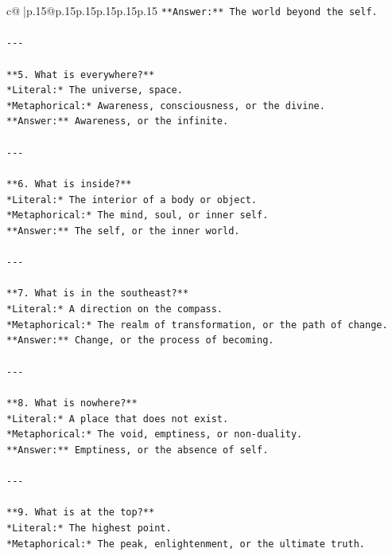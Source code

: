 \documentclass{article}
\begin{document}
{\begin{supertabular}{c@{$\;$}|p{.15\linewidth}@{}p{.15\linewidth}p{.15\linewidth}p{.15\linewidth}p{.15\linewidth}p{.15\linewidth}}
{{{\texttt{**Answer:** The world beyond the self.} \\
\\ 
\texttt{{-}{-}{-}} \\
\\ 
\texttt{**5. What is everywhere?**  } \\
\texttt{*Literal:* The universe, space.  } \\
\texttt{*Metaphorical:* Awareness, consciousness, or the divine.  } \\
\texttt{**Answer:** Awareness, or the infinite.} \\
\\ 
\texttt{{-}{-}{-}} \\
\\ 
\texttt{**6. What is inside?**  } \\
\texttt{*Literal:* The interior of a body or object.  } \\
\texttt{*Metaphorical:* The mind, soul, or inner self.  } \\
\texttt{**Answer:** The self, or the inner world.} \\
\\ 
\texttt{{-}{-}{-}} \\
\\ 
\texttt{**7. What is in the southeast?**  } \\
\texttt{*Literal:* A direction on the compass.  } \\
\texttt{*Metaphorical:* The realm of transformation, or the path of change.  } \\
\texttt{**Answer:** Change, or the process of becoming.} \\
\\ 
\texttt{{-}{-}{-}} \\
\\ 
\texttt{**8. What is nowhere?**  } \\
\texttt{*Literal:* A place that does not exist.  } \\
\texttt{*Metaphorical:* The void, emptiness, or non{-}duality.  } \\
\texttt{**Answer:** Emptiness, or the absence of self.} \\
\\ 
\texttt{{-}{-}{-}} \\
\\ 
\texttt{**9. What is at the top?**  } \\
\texttt{*Literal:* The highest point.  } \\
\texttt{*Metaphorical:* The peak, enlightenment, or the ultimate truth.  } \\
}}}
\end{supertabular}}
\end{document}
